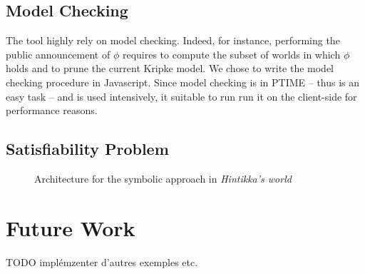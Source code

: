 \documentclass{article}
\begin{document}
\subsection{Model Checking}

The tool highly rely on model checking. Indeed, for instance, performing the public announcement of $\phi$ requires to compute the subset of worlds in which $\phi$ holds and to prune the current Kripke model. We chose to write the  model checking procedure in Javascript. Since model checking is in PTIME -- thus is an easy task -- and is used intensively, it suitable to run run it on the client-side  for performance reasons.

\subsection{Satisfiability Problem}



\begin{figure}
	\begin{center}
	\end{center}
	\caption{Architecture for the symbolic approach in \emph{Hintikka's world}\label{figure:architecture}}
\end{figure}

\section{Future Work}
\label{section:perspectives}


TODO implémzenter d'autres exemples etc.










\newpage





\end{document}

